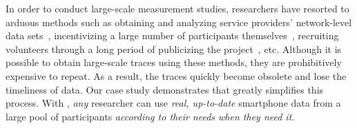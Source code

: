 In order to conduct large-scale measurement studies, researchers have resorted
to arduous methods such as obtaining and analyzing service providers'
network-level data sets~\cite{xu:imc:2011, trestian:imc:2009,
trestian:ton:2012}, incentivizing a large number of participants
themselves~\cite{falaki:mobisys:2010}, recruiting volunteers through a long
period of publicizing the project~\cite{shye:micro:2009}, etc. Although it is
possible to obtain large-scale traces using these methods, they are
prohibitively expensive to repeat. As a result, the traces quickly become
obsolete and lose the timeliness of data. Our case study demonstrates that
\PhoneLab{} greatly simplifies this process. With \PhoneLab{}, {\it any}
researcher can use {\it real, up-to-date} smartphone data from a large pool of
participants {\it according to their needs when they need it}.
